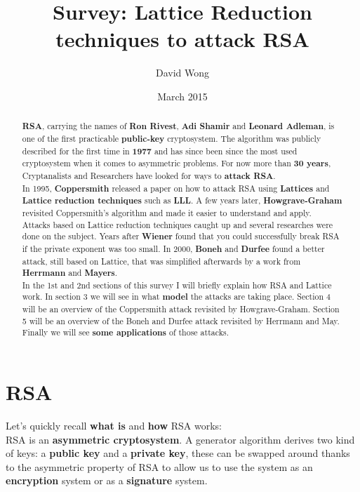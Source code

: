 \documentclass[a4paper,11pt]{article}
\title{Survey: Lattice Reduction techniques to attack RSA}
\author{David Wong}
\date{March 2015}
\begin{document}
\maketitle

\begin{abstract}
\textbf{RSA}, carrying the names of \textbf{Ron Rivest}, \textbf{Adi Shamir} and \textbf{Leonard Adleman}, is one of the first practicable \textbf{public-key} cryptosystem. The algorithm was publicly described for the first time in \textbf{1977} and has since been since the most used cryptosystem when it comes to asymmetric problems. For now more than \textbf{30 years}, Cryptanalists and Researchers have looked for ways to \textbf{attack RSA}.\\
In 1995, \textbf{Coppersmith} released a paper on how to attack RSA using \textbf{Lattices} and \textbf{Lattice reduction techniques} such as \textbf{LLL}. A few years later, \textbf{Howgrave-Graham} revisited Coppersmith's algorithm and made it easier to understand and apply.\\
Attacks based on Lattice reduction techniques caught up and several researches were done on the subject. Years after \textbf{Wiener} found that you could successfully break RSA if the private exponent was too small. In 2000, \textbf{Boneh} and \textbf{Durfee} found a better attack, still based on Lattice, that was simplified afterwards by a work from \textbf{Herrmann} and \textbf{Mayers}.\\
In the 1st and 2nd sections of this survey I will briefly explain how RSA and Lattice work. In section 3 we will see in what \textbf{model} the attacks are taking place. Section 4 will be an overview of the Coppersmith attack revisited by Howgrave-Graham. Section 5 will be an overview of the Boneh and Durfee attack revisited by Herrmann and May. Finally we will see \textbf{some applications} of those attacks.
\end{abstract}

\newpage

\section{RSA}\label{rsa}

Let's quickly recall \textbf{what is} and \textbf{how} RSA works:\\
RSA is an \textbf{asymmetric cryptosystem}. A generator algorithm derives two kind of keys: a \textbf{public key} and a \textbf{private key}, these can be swapped around thanks to the asymmetric property of RSA to allow us to use the system as an \textbf{encryption} system or as a \textbf{signature} system.\\
\end{document}
